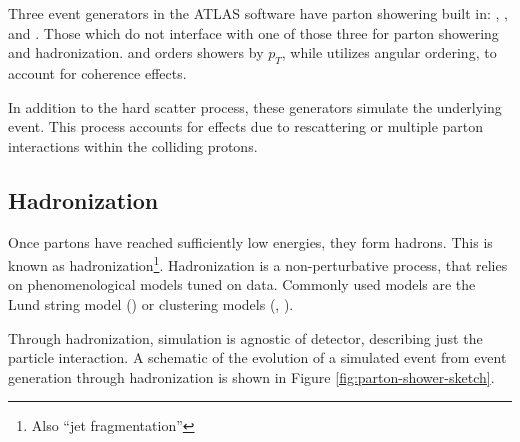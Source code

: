 Three event generators in the ATLAS software have parton showering built in: \PYTHIA, \HERWIG, and \SHERPA. Those which do not interface with one of those three for parton showering and hadronization. \PYTHIA and \SHERPA orders showers by $p_{T}$, while \HERWIG utilizes angular ordering, to account for coherence effects. 

In addition to the hard scatter process, these generators simulate the underlying event. This process accounts for effects due to rescattering or multiple parton interactions within the colliding protons.

\subsection{Hadronization} \label{ssec:hadronization}
Once partons have reached sufficiently low energies, they form hadrons. This is known as hadronization\footnote{Also ``jet fragmentation''}. Hadronization is a non-perturbative process, that relies on phenomenological models tuned on data. Commonly used models are the Lund string model \cite{lund-string} (\PYTHIA) or clustering models \cite{clustering-hadronization} (\HERWIG, \SHERPA).

Through hadronization, simulation is agnostic of detector, describing just the particle interaction. A schematic of the evolution of a simulated event from event generation through hadronization is shown in Figure \ref{fig:parton-shower-sketch}.


